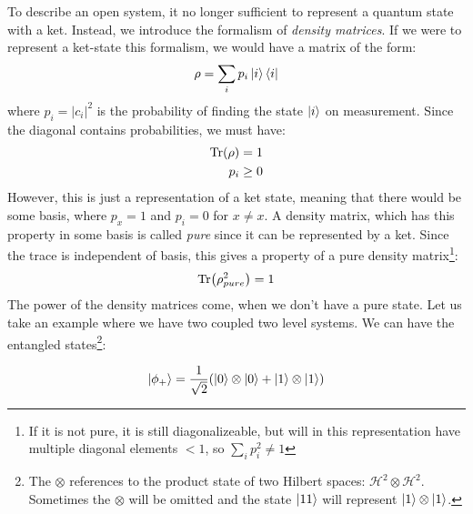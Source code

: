 To describe an open system, it no longer sufficient to represent a quantum state with a ket. Instead, we introduce the formalism of \textit{density matrices}. If we were to represent a ket-state this formalism, we would have a matrix of the form:
\begin{equation}
    \rho = \sum_i p_i \ket{i}\bra{i}
\end{equation}
where $p_i = |c_i|^2$ is the probability of finding the state $\ket{i}$ on measurement. Since the diagonal contains probabilities, we must have:
\begin{align}
    \Tr(\rho) &= 1 \\
    p_i &\geq 0
\end{align}
However, this is just a representation of a ket state, meaning that there would be some basis, where $p_x = 1$ and $p_i = 0$ for $x\neq x$. A density matrix, which has this property in some basis is called \textit{pure} since it can be represented by a ket. Since the trace is independent of basis, this gives a property of a pure density matrix\footnote{If it is not pure, it is still diagonalizeable, but will in this representation have multiple diagonal elements $<1$, so $\sum_i p_i^2 \neq 1$}:
\begin{equation}
    \Tr(\rho_{pure}^2) = 1
\end{equation}
The power of the density matrices come, when we don't have a pure state. Let us take an example where we have two coupled two level systems. We can have the entangled states\footnote{The $\otimes$ references to the product state of two Hilbert spaces: $\mathcal{H}^2 \otimes \mathcal{H}^2$. Sometimes the $\otimes$ will be omitted and the state $\ket{1 1}$ will represent $\ket{1} \otimes \ket{1}$.}:

\begin{equation}\label{eq:phi_plus}
    \ket{\phi_+} = \frac{1}{\sqrt{2}}(\ket{0}\otimes \ket{0} + \ket{1}\otimes\ket{1})
\end{equation}

